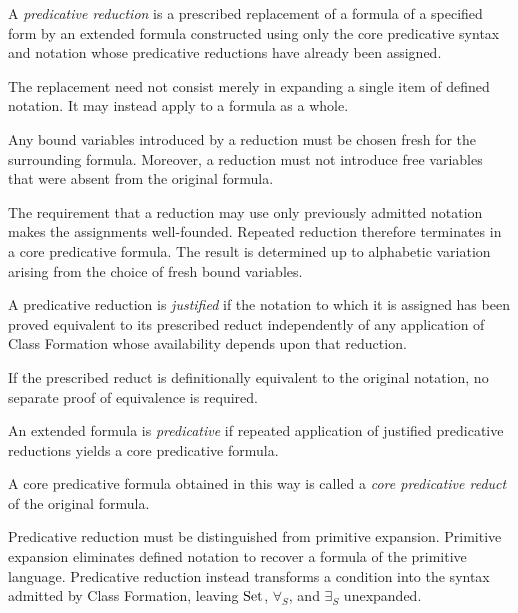 \begin{definition}
\label{def:predicative-reduction}
A \emph{predicative reduction} is a prescribed replacement of a formula of a specified form by an extended formula constructed using only the core predicative syntax and notation whose predicative reductions have already been assigned.

The replacement need not consist merely in expanding a single item of defined notation. It may instead apply to a formula as a whole.

Any bound variables introduced by a reduction must be chosen fresh for the surrounding formula. Moreover, a reduction must not introduce free variables that were absent from the original formula.
\end{definition}

The requirement that a reduction may use only previously admitted notation makes the assignments well-founded. Repeated reduction therefore terminates in a core predicative formula. The result is determined up to alphabetic variation arising from the choice of fresh bound variables.

\begin{definition}
\label{def:justification-of-predicative-reduction}
A predicative reduction is \emph{justified} if the notation to which it is assigned has been proved equivalent to its prescribed reduct independently of any application of Class Formation whose availability depends upon that reduction.

If the prescribed reduct is definitionally equivalent to the original notation, no separate proof of equivalence is required.
\end{definition}

\begin{definition}
\label{def:predicative-extended-formula}
An extended formula is \emph{predicative} if repeated application of justified predicative reductions yields a core predicative formula.

A core predicative formula obtained in this way is called a \emph{core predicative reduct} of the original formula.
\end{definition}

Predicative reduction must be distinguished from primitive expansion. Primitive expansion eliminates defined notation to recover a formula of the primitive language. Predicative reduction instead transforms a condition into the syntax admitted by Class Formation, leaving \(\operatorname{Set}\), \(\forall_S\), and \(\exists_S\) unexpanded.

